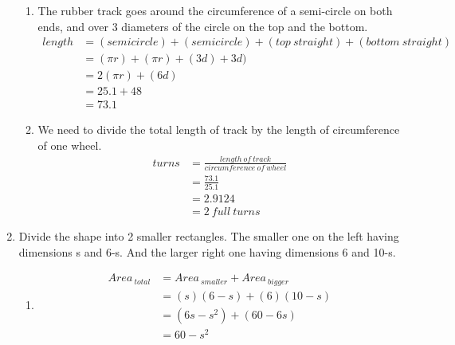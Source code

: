 \documentclass[11pt]{article}
\begin{document}
\begin{enumerate}
\begin{enumerate}
            \item The rubber track goes around the circumference of a semi-circle on both ends,
            and over 3 diameters of the circle on the top and the bottom.
            \begin{equation*}
                \begin{split}
                    length&=(semicircle)+(semicircle)+(top\ straight)+(bottom\ straight)\\
                    &=(\pi r)+(\pi r)+(3d)+3d)\\
                    &=2(\pi r)+(6d)\\
                    &=25.1+48\\
                    &=73.1
                \end{split}
            \end{equation*}

            \item We need to divide the total length of track by the length of circumference of one wheel.
            \begin{equation*}
                \begin{split}
                    turns&=\frac{length\ of\ track}{circumference\ of\ wheel}\\
                    &=\frac{73.1}{25.1}\\
                    &=2.9124\\
                    &=2\ full\ turns
                \end{split}
            \end{equation*}
        \end{enumerate}

    \pagebreak
    \item Divide the shape into 2 smaller rectangles.
    The smaller one on the left having dimensions s and 6-s.
    And the larger right one having dimensions 6 and 10-s.
        \begin{enumerate}
            \item 
            \begin{equation*}
                \begin{split}
                    Area_{\ total}&=Area_{\ smaller}+Area_{\ bigger}\\
                    &=(s)(6-s)+(6)(10-s)\\
                    &=(6s-s^2)+(60-6s)\\
                    &=60-s^2
                \end{split}
            \end{equation*}
            

\end{enumerate}
\end{enumerate}
\end{document}
